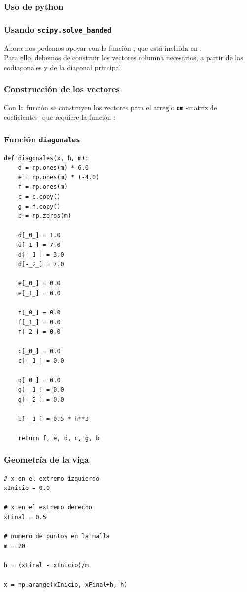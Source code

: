 \subsubsection{Uso de python}
\begin{frame}
\frametitle{Usando \texttt{scipy.solve\_banded}}
Ahora nos podemos apoyar con la función , que está incluida en .
\\
\bigskip
Para ello, debemos de construir los vectores columna necesarios, a partir de las codiagonales y  de la diagonal principal.
\end{frame}
\begin{frame}
\frametitle{Construcción de los vectores}
Con la función  se construyen los vectores para el arreglo \textbf{\texttt{cm}} -matriz de coeficientes- que requiere la función :
\end{frame}
\begin{frame}
\frametitle{Función \texttt{diagonales}}
\begin{lstlisting}[caption=Función que construye las codiagonales, style=FormattedNumber, basicstyle=\linespread{1.1}\ttfamily=\small, columns=fullflexible]
def diagonales(x, h, m):
    d = np.ones(m) * 6.0
    e = np.ones(m) * (-4.0)
    f = np.ones(m)
    c = e.copy()
    g = f.copy()
    b = np.zeros(m)
    
    d[_0_] = 1.0
    d[_1_] = 7.0
    d[-_1_] = 3.0
    d[-_2_] = 7.0
    
    e[_0_] = 0.0
    e[_1_] = 0.0
    
    f[_0_] = 0.0
    f[_1_] = 0.0
    f[_2_] = 0.0
    
    c[_0_] = 0.0
    c[-_1_] = 0.0
    
    g[_0_] = 0.0
    g[-_1_] = 0.0
    g[-_2_] = 0.0
    
    b[-_1_] = 0.5 * h**3
    
    return f, e, d, c, g, b
\end{lstlisting}
\end{frame}
\begin{frame}
\frametitle{Geometría de la viga}
\begin{lstlisting}[caption=Geometría de la viga, style=FormattedNumber, basicstyle=\linespread{1.1}\ttfamily=\small, columns=fullflexible]
 # x en el extremo izquierdo
xInicio = 0.0

# x en el extremo derecho
xFinal = 0.5

# numero de puntos en la malla
m = 20 

h = (xFinal - xInicio)/m

x = np.arange(xInicio, xFinal+h, h)
\end{lstlisting}
\end{frame}
